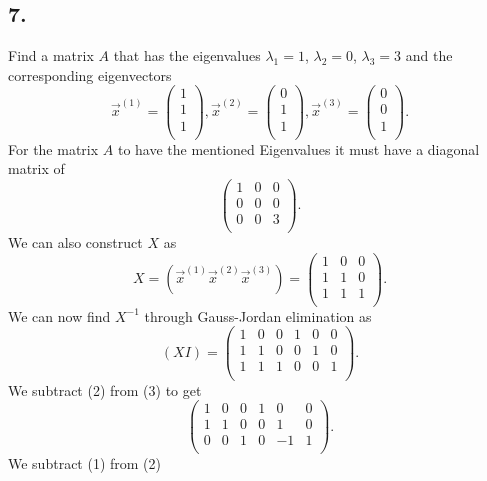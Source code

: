 \subsection*{7.} Find a matrix $A$ that has the eigenvalues $\lambda_1 = 1$, $\lambda_2 = 0$, $\lambda_3 = 3$ and the corresponding eigenvectors
\[ 
\Vec{x}^{(1)} = \begin{pmatrix}
1\\
1\\
1\\
\end{pmatrix}, \Vec{x}^{(2)} = \begin{pmatrix}
0\\
1\\
1\\
\end{pmatrix}, \Vec{x}^{(3)} = \begin{pmatrix}
0\\
0\\
1\\
\end{pmatrix}
.\]
\bigbreak
For the matrix $A$ to have the mentioned Eigenvalues it must have a diagonal matrix of
\[ 
\begin{pmatrix}
1 & 0 & 0\\
0 & 0 & 0\\
0 & 0 & 3\\
\end{pmatrix}
.\]
We can also construct $X$ as
\[ 
X = \left( \Vec{x}^{(1)} \Vec{x}^{(2)} \Vec{x}^{(3)} \right) = \begin{pmatrix}
1 & 0 & 0\\
1 & 1 & 0\\
1 & 1 & 1\\
\end{pmatrix}
.\]
We can now find $X^{-1}$ through Gauss-Jordan elimination as
\[ 
  (XI) = \left( \begin{array}{ccc|ccc}
  1 & 0 & 0 & 1 & 0 & 0\\
  1 & 1 & 0 & 0 & 1 & 0\\
  1 & 1 & 1 & 0 & 0 & 1\\
  \end{array} \right)
.\]
We subtract (2) from (3) to get
\[ 
\left( \begin{array}{ccc|ccc}
1 & 0 & 0 & 1 & 0 & 0\\
1 & 1 & 0 & 0 & 1 & 0\\
0 & 0 & 1 & 0 & -1 & 1\\
\end{array} \right)
.\]
We subtract (1) from (2)
